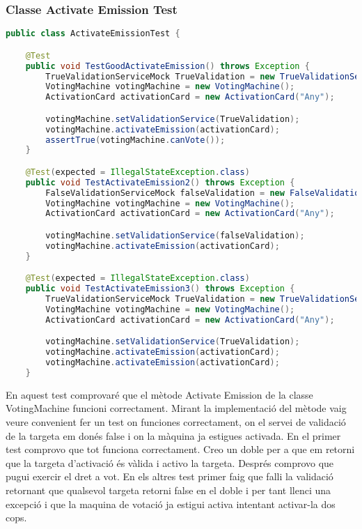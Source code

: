 \documentclass[11pt]{article}
\begin{document}
\subsubsection{Classe Activate Emission Test}
\begin{lstlisting}[basicstyle=\ttfamily\scriptsize,language=Java]
public class ActivateEmissionTest {

    @Test
    public void TestGoodActivateEmission() throws Exception {
        TrueValidationServiceMock TrueValidation = new TrueValidationServiceMock();
        VotingMachine votingMachine = new VotingMachine();
        ActivationCard activationCard = new ActivationCard("Any");

        votingMachine.setValidationService(TrueValidation);
        votingMachine.activateEmission(activationCard);
        assertTrue(votingMachine.canVote());
    }

    @Test(expected = IllegalStateException.class)
    public void TestActivateEmission2() throws Exception {
        FalseValidationServiceMock falseValidation = new FalseValidationServiceMock();
        VotingMachine votingMachine = new VotingMachine();
        ActivationCard activationCard = new ActivationCard("Any");

        votingMachine.setValidationService(falseValidation);
        votingMachine.activateEmission(activationCard);
    }

    @Test(expected = IllegalStateException.class)
    public void TestActivateEmission3() throws Exception {
        TrueValidationServiceMock TrueValidation = new TrueValidationServiceMock();
        VotingMachine votingMachine = new VotingMachine();
        ActivationCard activationCard = new ActivationCard("Any");

        votingMachine.setValidationService(TrueValidation);
        votingMachine.activateEmission(activationCard);
        votingMachine.activateEmission(activationCard);
    }
	\end{lstlisting}
	En aquest test comprovaré que el mètode Activate Emission de la classe VotingMachine funcioni correctament. Mirant la implementació del mètode vaig veure convenient fer un test on funciones correctament, on el servei de validació de la targeta em donés false i on la màquina ja estigues activada. En el primer test comprovo que tot funciona correctament. Creo un doble per a que em retorni que la targeta d'activació és vàlida i activo la targeta. Després comprovo que pugui exercir el dret a vot. En els altres test primer faig que falli la validació retornant que qualsevol targeta retorni false en el doble i per tant llenci una excepció i que la maquina de votació ja estigui activa intentant activar-la dos cops.
	\newpage
\end{document}

